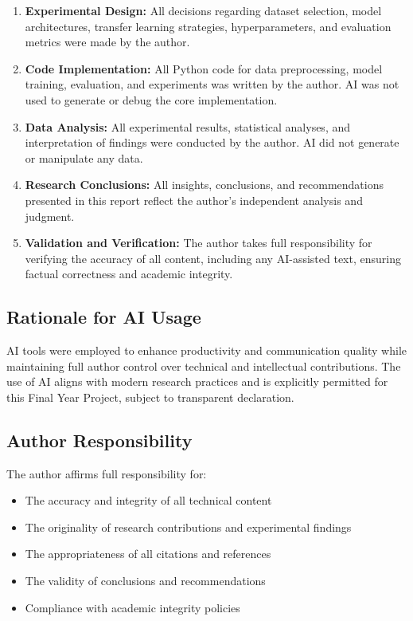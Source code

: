 \documentclass[12pt,a4paper]{report}
\begin{document}
\begin{enumerate}
    \item \textbf{Experimental Design:} All decisions regarding dataset selection, model architectures, transfer learning strategies, hyperparameters, and evaluation metrics were made by the author.
    
    \item \textbf{Code Implementation:} All Python code for data preprocessing, model training, evaluation, and experiments was written by the author. AI was not used to generate or debug the core implementation.
    
    \item \textbf{Data Analysis:} All experimental results, statistical analyses, and interpretation of findings were conducted by the author. AI did not generate or manipulate any data.
    
    \item \textbf{Research Conclusions:} All insights, conclusions, and recommendations presented in this report reflect the author's independent analysis and judgment.
    
    \item \textbf{Validation and Verification:} The author takes full responsibility for verifying the accuracy of all content, including any AI-assisted text, ensuring factual correctness and academic integrity.
\end{enumerate}

\subsection{Rationale for AI Usage}

AI tools were employed to enhance productivity and communication quality while maintaining full author control over technical and intellectual contributions. The use of AI aligns with modern research practices and is explicitly permitted for this Final Year Project, subject to transparent declaration.

\subsection{Author Responsibility}

The author affirms full responsibility for:
\begin{itemize}
    \item The accuracy and integrity of all technical content
    \item The originality of research contributions and experimental findings
    \item The appropriateness of all citations and references
    \item The validity of conclusions and recommendations
    \item Compliance with academic integrity policies
\end{itemize}
\end{document}
